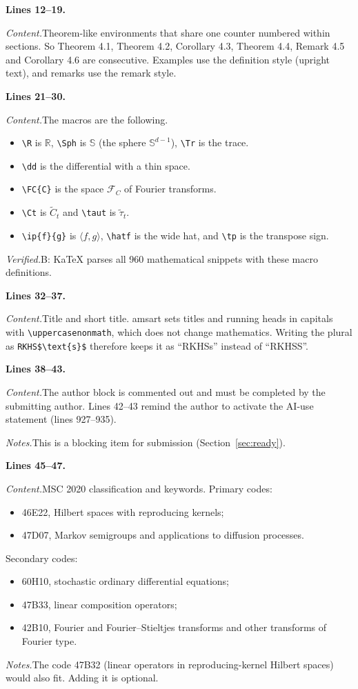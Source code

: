 \documentclass[11pt]{amsart}
\newcommand{\R}{\mathbb{R}}
\newcommand{\Sph}{\mathbb{S}}
\newcommand{\Tr}{\operatorname{Tr}}
\newcommand{\dd}{\,\mathrm{d}}
\newcommand{\FC}[1]{\mathcal{F}_{#1}}
\newcommand{\Ct}{\widetilde{C}_t}
\newcommand{\taut}{\widetilde{\tau}_t}
\newcommand{\ip}[2]{\langle #1,#2\rangle}
\newcommand{\hatf}[1]{\widehat{#1}}
\newcommand{\tp}{\top}
\newcommand{\src}[1]{\par\bigskip\noindent\textbf{Lines #1.}\enspace}
\newcommand{\content}{\par\smallskip\noindent\textit{Content.}\enspace}
\newcommand{\verified}{\par\smallskip\noindent\textit{Verified.}\enspace}
\newcommand{\notes}{\par\smallskip\noindent\textit{Notes.}\enspace}
\newcommand{\tB}{\textsf{B}}
\begin{document}
\src{12--19}
\content Theorem-like environments that share one counter numbered within sections. So Theorem 4.1, Theorem 4.2,
Corollary 4.3, Theorem 4.4, Remark 4.5 and Corollary 4.6 are consecutive. Examples use the definition style (upright
text), and remarks use the remark style.

\src{21--30}
\content The macros are the following.
\begin{itemize}
\item \verb|\R| is $\R$, \verb|\Sph| is $\Sph$ (the sphere $\Sph^{d-1}$), \verb|\Tr| is the trace.
\item \verb|\dd| is the differential with a thin space.
\item \verb|\FC{C}| is the space $\FC{C}$ of Fourier transforms.
\item \verb|\Ct| is $\Ct$ and \verb|\taut| is $\taut$.
\item \verb|\ip{f}{g}| is $\ip fg$, \verb|\hatf| is the wide hat, and \verb|\tp| is the transpose sign.
\end{itemize}
\verified \tB: KaTeX parses all 960 mathematical snippets with these macro definitions.

\src{32--37}
\content Title and short title. amsart sets titles and running heads in capitals with \verb|\uppercasenonmath|, which
does not change mathematics. Writing the plural as \verb|RKHS$\text{s}$| therefore keeps it as ``RKHSs'' instead of
``RKHSS''.

\src{38--43}
\content The author block is commented out and must be completed by the submitting author. Lines 42--43 remind the
author to activate the AI-use statement (lines 927--935).
\notes This is a blocking item for submission (Section~\ref{sec:ready}).

\src{45--47}
\content MSC 2020 classification and keywords. Primary codes:
\begin{itemize}
\item 46E22, Hilbert spaces with reproducing kernels;
\item 47D07, Markov semigroups and applications to diffusion processes.
\end{itemize}
Secondary codes:
\begin{itemize}
\item 60H10, stochastic ordinary differential equations;
\item 47B33, linear composition operators;
\item 42B10, Fourier and Fourier--Stieltjes transforms and other transforms of Fourier type.
\end{itemize}
\notes The code 47B32 (linear operators in reproducing-kernel Hilbert spaces) would also fit. Adding it is optional.
\end{document}

